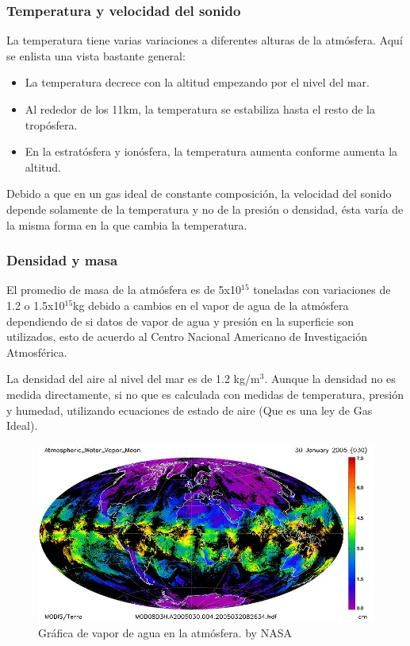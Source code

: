 \documentclass{article}
\begin{document}
\subsubsection{Temperatura y velocidad del sonido}
La temperatura tiene varias variaciones a diferentes alturas de la atmósfera. Aquí se enlista una vista bastante general:
\begin{itemize}
    \item La temperatura decrece con la altitud empezando por el nivel del mar.
    \item Al rededor de los 11km, la temperatura se estabiliza hasta el resto de la tropósfera.
    \item En la estratósfera y ionósfera, la temperatura aumenta conforme aumenta la altitud.
\end{itemize}
Debido a que en un gas ideal de constante composición, la velocidad del sonido depende solamente de la temperatura y no de la presión o densidad, ésta varía de la misma forma en la que cambia la temperatura.

\subsubsection{Densidad y masa}
El promedio de masa de la atmósfera es de 5x10$^15$ toneladas con variaciones de 1.2 o 1.5x10$^15$kg debido a cambios en el vapor de agua de la atmósfera dependiendo de si datos de vapor de agua y presión en la superficie son utilizados, esto de acuerdo al Centro Nacional Americano de Investigación Atmosférica.

La densidad del aire al nivel del mar es de 1.2 kg/m$^3$. Aunque la densidad no es medida directamente, si no que es calculada con medidas de temperatura, presión y humedad, utilizando ecuaciones de estado de aire (Que es una ley de Gas Ideal).





\newpage
\begin{figure}
    \includegraphics[width=\linewidth]{vapor.jpg}
    \caption{Gráfica de vapor de agua en la atmósfera. by NASA}
    \label{fig:foto2}
\end{figure}
\newpage
\end{document}
